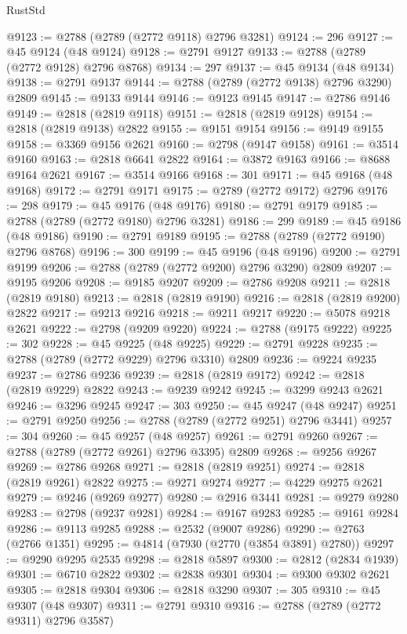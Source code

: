 \begin{lexlean}{RustStd}
\begin{coremodule}
@9123 := @2788 (@2789 (@2772 @9118) @2796 @3281)
@9124 := 296
@9127 := @45 @9124 (@48 @9124)
@9128 := @2791 @9127
@9133 := @2788 (@2789 (@2772 @9128) @2796 @8768)
@9134 := 297
@9137 := @45 @9134 (@48 @9134)
@9138 := @2791 @9137
@9144 := @2788 (@2789 (@2772 @9138) @2796 @3290) @2809
@9145 := @9133 @9144
@9146 := @9123 @9145
@9147 := @2786 @9146
@9149 := @2818 (@2819 @9118)
@9151 := @2818 (@2819 @9128)
@9154 := @2818 (@2819 @9138) @2822
@9155 := @9151 @9154
@9156 := @9149 @9155
@9158 := @3369 @9156 @2621
@9160 := @2798 (@9147 @9158)
@9161 := @3514 @9160
@9163 := @2818 @6641 @2822
@9164 := @3872 @9163
@9166 := @8688 @9164 @2621
@9167 := @3514 @9166
@9168 := 301
@9171 := @45 @9168 (@48 @9168)
@9172 := @2791 @9171
@9175 := @2789 (@2772 @9172) @2796
@9176 := 298
@9179 := @45 @9176 (@48 @9176)
@9180 := @2791 @9179
@9185 := @2788 (@2789 (@2772 @9180) @2796 @3281)
@9186 := 299
@9189 := @45 @9186 (@48 @9186)
@9190 := @2791 @9189
@9195 := @2788 (@2789 (@2772 @9190) @2796 @8768)
@9196 := 300
@9199 := @45 @9196 (@48 @9196)
@9200 := @2791 @9199
@9206 := @2788 (@2789 (@2772 @9200) @2796 @3290) @2809
@9207 := @9195 @9206
@9208 := @9185 @9207
@9209 := @2786 @9208
@9211 := @2818 (@2819 @9180)
@9213 := @2818 (@2819 @9190)
@9216 := @2818 (@2819 @9200) @2822
@9217 := @9213 @9216
@9218 := @9211 @9217
@9220 := @5078 @9218 @2621
@9222 := @2798 (@9209 @9220)
@9224 := @2788 (@9175 @9222)
@9225 := 302
@9228 := @45 @9225 (@48 @9225)
@9229 := @2791 @9228
@9235 := @2788 (@2789 (@2772 @9229) @2796 @3310) @2809
@9236 := @9224 @9235
@9237 := @2786 @9236
@9239 := @2818 (@2819 @9172)
@9242 := @2818 (@2819 @9229) @2822
@9243 := @9239 @9242
@9245 := @3299 @9243 @2621
@9246 := @3296 @9245
@9247 := 303
@9250 := @45 @9247 (@48 @9247)
@9251 := @2791 @9250
@9256 := @2788 (@2789 (@2772 @9251) @2796 @3441)
@9257 := 304
@9260 := @45 @9257 (@48 @9257)
@9261 := @2791 @9260
@9267 := @2788 (@2789 (@2772 @9261) @2796 @3395) @2809
@9268 := @9256 @9267
@9269 := @2786 @9268
@9271 := @2818 (@2819 @9251)
@9274 := @2818 (@2819 @9261) @2822
@9275 := @9271 @9274
@9277 := @4229 @9275 @2621
@9279 := @9246 (@9269 @9277)
@9280 := @2916 @3441
@9281 := @9279 @9280
@9283 := @2798 (@9237 @9281)
@9284 := @9167 @9283
@9285 := @9161 @9284
@9286 := @9113 @9285
@9288 := @2532 (@9007 @9286)
@9290 := @2763 (@2766 @1351)
@9295 := @4814 (@7930 (@2770 (@3854 @3891) @2780))
@9297 := @9290 @9295 @2535
@9298 := @2818 @5897
@9300 := @2812 (@2834 @1939)
@9301 := @6710 @2822
@9302 := @2838 @9301
@9304 := @9300 @9302 @2621
@9305 := @2818 @9304
@9306 := @2818 @3290
@9307 := 305
@9310 := @45 @9307 (@48 @9307)
@9311 := @2791 @9310
@9316 := @2788 (@2789 (@2772 @9311) @2796 @3587)

\end{coremodule}
\end{lexlean}
